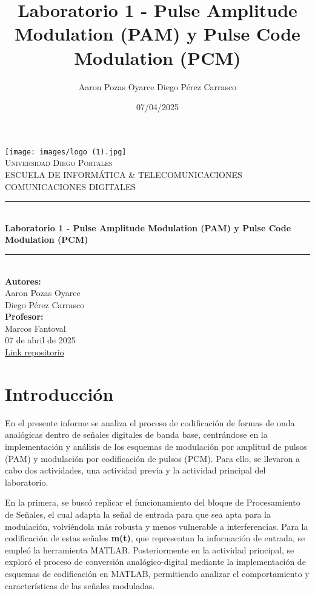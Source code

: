 \documentclass[12pt]{article}
\title{Laboratorio 1 - Pulse Amplitude Modulation (PAM) y Pulse Code Modulation (PCM)}					%
\author{Aaron Pozas Oyarce \linebreak
Diego Pérez Carrasco\linebreak
\newline
\bttext{Profesor: \linebreak Marcos Fantoval}}
\date{07/04/2025}%
\begin{document}
\begin{titlepage}
	\centering
    \vspace*{0.0cm}
    \texttt{[image: images/logo (1).jpg]}\\
    \textsc{\LARGE Universidad Diego Portales}\\[0.2cm]
	\textsc{\large ESCUELA DE INFORMÁTICA \& TELECOMUNICACIONES}\\[2cm]
	\textsc{\LARGE COMUNICACIONES DIGITALES}\\[1cm]
	
    \rule{\linewidth}{0.2mm} \\[0.4cm]
    {\huge \bfseries Laboratorio 1 - Pulse Amplitude Modulation (PAM) y Pulse Code Modulation (PCM)}\\
    \rule{\linewidth}{0.2mm} \\[1.5cm]
	
    {\Large \textbf{Autores:}}\\
    Aaron Pozas Oyarce \\
    Diego Pérez Carrasco \\[1cm]
	
    {\Large \textbf{Profesor:}}\\
    Marcos Fantoval \\[1.5cm]
    
	{\large 07 de abril de 2025}\\ [0.2cm]
    \href{https://github.com/deigodd/Lab01-Comunicaciones_Digitales}{Link repositorio} \\[1cm]
\end{titlepage}



\newpage
\tableofcontents
\newpage

\section{Introducción}

En el presente informe se analiza el proceso de codificación de formas de onda analógicas dentro de señales digitales de banda base, centrándose en la implementación y análisis de los esquemas de modulación por amplitud de pulsos (PAM) y modulación por codificación de pulsos (PCM). Para ello, se llevaron a cabo dos actividades, una actividad previa y la actividad principal del laboratorio.

En la primera, se buscó replicar el funcionamiento del bloque de Procesamiento de Señales, el cual adapta la señal de entrada para que sea apta para la modulación, volviéndola más robusta y menos vulnerable a interferencias. Para la codificación de estas señales \textbf{m(t)}, que representan la información de entrada, se empleó la herramienta MATLAB. Posteriormente en la actividad principal, se exploró el proceso de conversión analógico-digital mediante la implementación de esquemas de codificación en MATLAB, permitiendo analizar el comportamiento y características de las señales moduladas.
\end{document}
